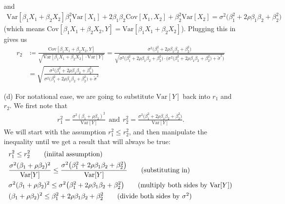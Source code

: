 \documentclass[10pt]{article}
\begin{document}
\begin{itemize}
\begin{align*}
    \end{align*}
    and 
    \begin{align*}
        \mathrm{Var}[\beta_1 X_1 + \beta_2 X_2]
        \beta_1^2 \mathrm{Var}[X_1] + 2 \beta_1 \beta_2 \mathrm{Cov}[X_1, X_2] + \beta_2^2 \mathrm{Var}[X_2]
         = \sigma^2 \big( \beta_1^2 + 2 \rho \beta_1 \beta_2 + \beta_2^2 \big)
    \end{align*}
    (which means \(\mathrm{Cov}[\beta_1 X_1 + \beta_2 X_2, Y] = \mathrm{Var}[\beta_1 X_1 + \beta_2 X_2]\)). Plugging this in gives us 
    \begin{align*}
        r_2 
        &\coloneqq \frac{\mathrm{Cov}[\beta_1 X_1 + \beta_2 X_2, Y]}{\sqrt{\mathrm{Var}[\beta_1 X_1 + \beta_2 X_2] \cdot \mathrm{Var}[Y]}}
        = \frac{\sigma^2 \big( \beta_1^2 + 2 \rho \beta_1 \beta_2 + \beta_2^2 \big)}{\sqrt{\sigma^2 \big( \beta_1^2 + 2 \rho \beta_1 \beta_2 + \beta_2^2 \big) \cdot \Big( \sigma^2 \big( \beta_1^2 + 2 \rho \beta_1 \beta_2 + \beta_2^2 \big) + \tilde{\sigma}^2 \Big)}} \\
        &= \sqrt{\frac{\sigma^2 \big( \beta_1^2 + 2 \rho \beta_1 \beta_2 + \beta_2^2 \big)}{\sigma^2 \big( \beta_1^2 + 2 \rho \beta_1 \beta_2 + \beta_2^2 \big) + \tilde{\sigma}^2}}
    \end{align*}
    \item[(d)] For notational ease, we are going to substitute \(\mathrm{Var}[Y]\) back into \(r_1\) and \(r_2\).
    We first note that 
    \begin{align*}
        r_1^2 = \frac{\sigma^2 (\beta_1 + \rho \beta_2)^2}{\mathrm{Var}[Y]}
        ~~\text{and}~~
        r_2^2 = \frac{\sigma^2 \big( \beta_1^2 + 2 \rho \beta_1 \beta_2 + \beta_2^2 \big)}{\mathrm{Var}[Y]}.
    \end{align*}
    We will start with the assumption \(r_1^2 \le r_2^2\), and then manipulate the inequality until we get a result that will always be true:
    \begin{align}
        & r_1^2 \le r_2^2 \tag{iniital assumption} \\
        & \frac{\sigma^2 (\beta_1 + \rho \beta_2)^2}{\mathrm{Var}[Y]} \le \frac{\sigma^2 \big( \beta_1^2 + 2 \rho \beta_1 \beta_2 + \beta_2^2 \big)}{\mathrm{Var}[Y]} \tag{substituting in} \\
        & \sigma^2 (\beta_1 + \rho \beta_2)^2 \le \sigma^2 \big( \beta_1^2 + 2 \rho \beta_1 \beta_2 + \beta_2^2 \big) \tag{multiply both sides by \(\mathrm{Var}[Y]\)} \\
        & (\beta_1 + \rho \beta_2)^2 \le \beta_1^2 + 2 \rho \beta_1 \beta_2 + \beta_2^2 \tag{divide both sides by \(\sigma^2\)} \\

\end{align}
\end{itemize}
\end{document}
